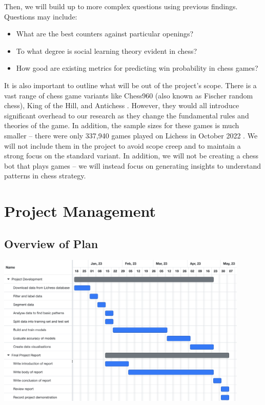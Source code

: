 \documentclass[%
 superscriptaddress,
showpacs,preprintnumbers,
 amsmath,
 amssymb,
 aps,
 pra,
showkeys,
onecolumn,
notitlepage,
11pt,
tightenlines      %
]{revtex4-1}
\begin{document}
Then, we will build up to more complex questions using previous findings. Questions may include:
\begin{itemize}
    \item What are the best counters against particular openings?
    \item To what degree is social learning theory evident in chess?
    \item How good are existing metrics for predicting win probability in chess games?
\end{itemize}

It is also important to outline what will be out of the project's scope. There is a vast range of chess game variants like Chess960 (also known as Fischer random chess), King of the Hill, and Antichess \cite{lichessBlitzRatingDistribution}. However, they would all introduce significant overhead to our research as they change the fundamental rules and theories of the game. In addition, the sample sizes for these games is much smaller -- there were only 337,940 games played on Lichess in October 2022 \cite{lichessOpenDatabase}. We will not include them in the project to avoid scope creep and to maintain a strong focus on the standard variant. In addition, we will not be creating a chess bot that plays games -- we will instead focus on generating insights to understand patterns in chess strategy.

\section{Project Management}

\subsection{Overview of Plan}
\begin{center}
    \includegraphics[width=0.9\textwidth]{images/Gantt Chart - Project Management.png}
\end{center}
\end{document}
